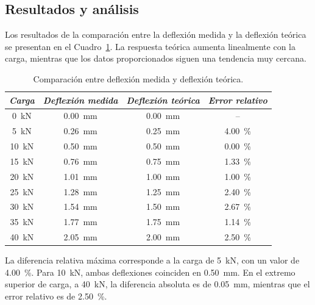 \subsection{Resultados y análisis}

Los resultados de la comparación entre la deflexión medida y la deflexión teórica se presentan en el Cuadro~\ref{table:deflexion}. La respuesta teórica aumenta linealmente con la carga, mientras que los datos proporcionados siguen una tendencia muy cercana.

\begin{table}[hbtp]
\caption{Comparación entre deflexión medida y deflexión teórica.}
\footnotesize
\centering
\begin{tabular}{cccc}
\toprule
\textit{Carga} &
\textit{Deflexión medida} &
\textit{Deflexión teórica} &
\textit{Error relativo} \\
\midrule
\SI{0}{\kilo\newton}  & \SI{0,00}{\milli\meter} & \SI{0,00}{\milli\meter} & -- \\
\SI{5}{\kilo\newton}  & \SI{0,26}{\milli\meter} & \SI{0,25}{\milli\meter} & \SI{4,00}{\percent} \\
\SI{10}{\kilo\newton} & \SI{0,50}{\milli\meter} & \SI{0,50}{\milli\meter} & \SI{0,00}{\percent} \\
\SI{15}{\kilo\newton} & \SI{0,76}{\milli\meter} & \SI{0,75}{\milli\meter} & \SI{1,33}{\percent} \\
\SI{20}{\kilo\newton} & \SI{1,01}{\milli\meter} & \SI{1,00}{\milli\meter} & \SI{1,00}{\percent} \\
\SI{25}{\kilo\newton} & \SI{1,28}{\milli\meter} & \SI{1,25}{\milli\meter} & \SI{2,40}{\percent} \\
\SI{30}{\kilo\newton} & \SI{1,54}{\milli\meter} & \SI{1,50}{\milli\meter} & \SI{2,67}{\percent} \\
\SI{35}{\kilo\newton} & \SI{1,77}{\milli\meter} & \SI{1,75}{\milli\meter} & \SI{1,14}{\percent} \\
\SI{40}{\kilo\newton} & \SI{2,05}{\milli\meter} & \SI{2,00}{\milli\meter} & \SI{2,50}{\percent} \\
\bottomrule
\end{tabular}
\label{table:deflexion}
\end{table}

La diferencia relativa máxima corresponde a la carga de \SI{5}{\kilo\newton}, con un valor de \SI{4,00}{\percent}. Para \SI{10}{\kilo\newton}, ambas deflexiones coinciden en \SI{0,50}{\milli\meter}. En el extremo superior de carga, a \SI{40}{\kilo\newton}, la diferencia absoluta es de \SI{0,05}{\milli\meter}, mientras que el error relativo es de \SI{2,50}{\percent}.


